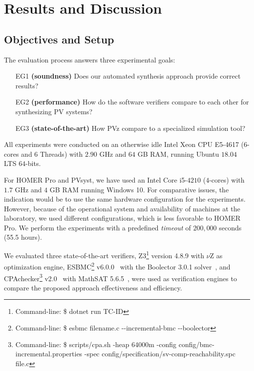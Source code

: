 \documentclass[journal]{IEEEtran}
\begin{document}
\section{Results and Discussion}

\subsection{Objectives and Setup}
\label{ObjectivesAndSetup}

The evaluation process answers three experimental goals:

\begin{enumerate}
\item [EG1] \textbf{(soundness)} Does our automated synthesis approach provide correct results?
\item [EG2] \textbf{(performance)} How do the software verifiers compare to each other for synthesizing PV systems?
\item [EG3] \textbf{(state-of-the-art)} How PVz compare to a specialized simulation tool?
\end{enumerate}

All experiments were conducted on an otherwise idle Intel Xeon CPU E5-4617 ($6$-cores and 6 Threads) with $2.90$ GHz and $64$ GB RAM, running Ubuntu $18.04$ LTS $64$-bits. 

For HOMER Pro and PVsyst, we have used an Intel Core i5-$4210$ ($4$-cores) with $1.7$ GHz and $4$ GB RAM running Windows 10. For comparative issues, the indication would be to use the same hardware configuration for the experiments. However, because of the operational system and availability of machines at the laboratory, we used different configurations, which is less favorable to HOMER Pro. We perform the experiments with a predefined \textit{timeout} of $200,000$ seconds (55.5 hours).\color{black}

We evaluated three state-of-the-art verifiers, Z3\footnote{Command-line: \$ dotnet run TC-ID} version 4.8.9 with $\nu$Z as optimization engine, ESBMC\footnote{Command-line: \$ esbmc filename.c -\phantom{}-incremental-bmc -\phantom{}-boolector} v6.0.0~\cite{esbmc2018} with the Boolector 3.0.1 solver~\cite{Brummayer}, and CPAchecker\footnote{Command-line: \$ scripts/cpa.sh -heap 64000m -config config/bmc-incremental.properties -spec config/specification/sv-comp-reachability.spc file.c} v2.0~\cite{Beyer2011} with MathSAT 5.6.5~\cite{mathsat5}, were used as verification engines to compare the proposed approach effectiveness and efficiency.
\end{document}
